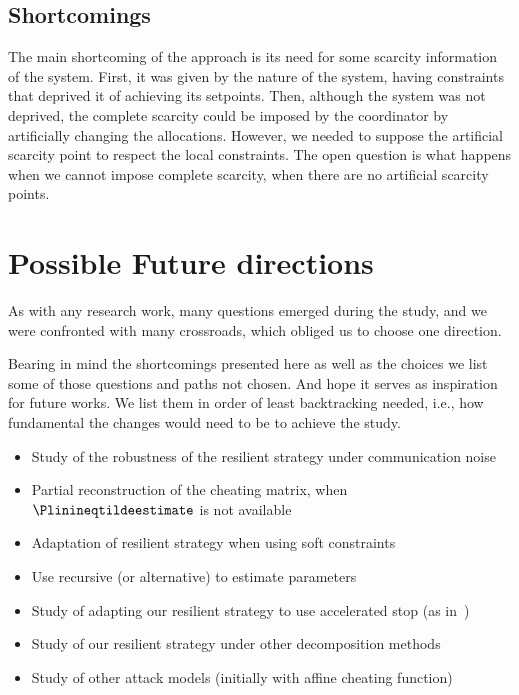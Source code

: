 \documentclass[../main.tex]{subfiles}
\begin{document}
\subsection{Shortcomings}
The main shortcoming of the approach is its need for some scarcity information of the system.
First, it was given by the nature of the system, having constraints that deprived it of achieving its setpoints.
Then, although the system was not deprived, the complete scarcity could be imposed by the coordinator by artificially changing the allocations.
However, we needed to suppose the artificial scarcity point to respect the local constraints.
The open question is what happens when we cannot impose complete scarcity, when there are no artificial scarcity points.

\section{Possible Future directions}
As with any research work, many questions emerged during the study, and we were confronted with many crossroads, which obliged us to choose one direction.

Bearing in mind the shortcomings presented here as well as the choices we list some of those questions and paths not chosen.
And hope it serves as inspiration for future works.
We list them in order of least backtracking needed, i.e., how fundamental the changes would need to be to achieve the study.
\begin{itemize}
  \item Study of the robustness of the resilient strategy under communication noise
  \item Partial reconstruction of the cheating matrix, when $\Plinineqtildeestimate$ is not available
  \item Adaptation of resilient strategy when using soft constraints~\cite{AlessioBemporad2009}
  \item Use recursive \EM{} (or alternative) to estimate parameters
  \item Study of adapting our resilient strategy to use accelerated stop (as in~\cite{DaiEtAl2017})
  \item Study of our resilient strategy under other decomposition methods
  \item Study of other attack models (initially with affine cheating function)
\end{itemize}
\end{document}
